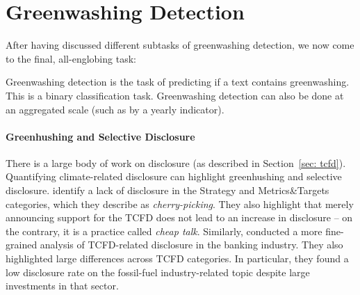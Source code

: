 \section{Greenwashing Detection}
\label{sec: greenwashing signals}

After having discussed different subtasks of greenwashing detection, we now come to the final, all-englobing task:

\task Greenwashing detection is the task of predicting if a text contains greenwashing. This is a binary classification task. Greenwashing detection can also be done at an aggregated scale (such as by a yearly indicator).

\paragraph{Greenhushing and Selective Disclosure}  There is a large body of work on disclosure (as described in Section~\ref{sec: tcfd}). Quantifying climate-related disclosure can highlight greenhushing and selective disclosure. \citet{bingler_cheap_2021} identify a lack of disclosure in the Strategy and Metrics\&Targets categories, which they describe as \textit{cherry-picking}. They also highlight that merely announcing support for the TCFD does not lead to an increase in disclosure -- on the contrary, it is a practice called \textit{cheap talk}. Similarly, \citet{auzepy_evaluating_2023} conducted a more fine-grained analysis of TCFD-related disclosure in the banking industry. They also highlighted large differences across TCFD categories. In particular, they found a low disclosure rate on the fossil-fuel industry-related topic despite large investments in that sector.


